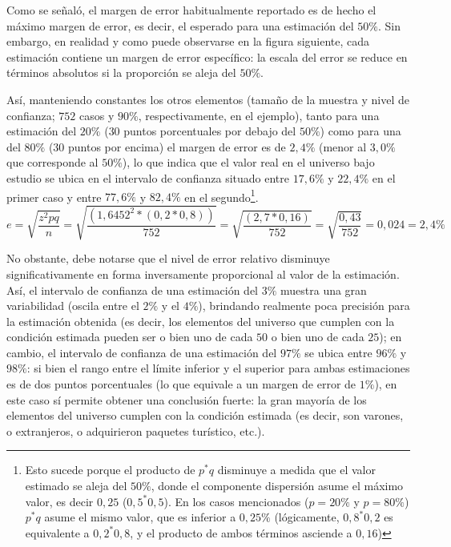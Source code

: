 \documentclass[
]{book}
\begin{document}
Como se señaló, el margen de error habitualmente reportado es de hecho el máximo margen de error, es decir, el esperado para una estimación del \(50\%\). Sin embargo, en realidad y como puede observarse en la figura siguiente, cada estimación contiene un margen de error específico: la escala del error se reduce en términos absolutos si la proporción se aleja del \(50\%\).

Así, manteniendo constantes los otros elementos (tamaño de la muestra y nivel de confianza; \(752\) casos y \(90\%\), respectivamente, en el ejemplo), tanto para una estimación del \(20\%\) (\(30\) puntos porcentuales por debajo del \(50\%\)) como para una del \(80\%\) (\(30\) puntos por encima) el margen de error es de \(2,4\%\) (menor al \(3,0\%\) que corresponde al \(50\%\)), lo que indica que el valor real en el universo bajo estudio se ubica en el intervalo de confianza situado entre \(17,6\%\) y \(22,4\%\) en el primer caso y entre \(77,6\%\) y \(82,4\%\) en el segundo\footnote{Esto sucede porque el producto de \(p^*q\) disminuye a medida que el valor estimado se aleja del \(50\%\), donde el componente dispersión asume el máximo valor, es decir \(0,25\) (\(0,5^*0,5\)). En los casos mencionados (\(p=20\%\) y \(p=80\%\)) \(p^*q\) asume el mismo valor, que es inferior a \(0,25\%\) (lógicamente, \(0,8^*0,2\) es equivalente a \(0,2^*0,8\), y el producto de ambos términos asciende a \(0,16\))}.\\

\[ e = \sqrt{\frac{z^2pq}{n}} = \sqrt{\frac{(1,6452^2 * (0,2 * 0,8))}{752}} = \sqrt{\frac{(2,7 * 0,16)}{752}} = \sqrt{\frac{0,43}{752}} = 0,024 = 2,4 \% \]

No obstante, debe notarse que el nivel de error relativo disminuye significativamente en forma inversamente proporcional al valor de la estimación. Así, el intervalo de confianza de una estimación del \(3\%\) muestra una gran variabilidad (oscila entre el \(2\%\) y el \(4\%\)), brindando realmente poca precisión para la estimación obtenida (es decir, los elementos del universo que cumplen con la condición estimada pueden ser o bien uno de cada \(50\) o bien uno de cada \(25\)); en cambio, el intervalo de confianza de una estimación del \(97\%\) se ubica entre \(96\%\) y \(98\%\): si bien el rango entre el límite inferior y el superior para ambas estimaciones es de dos puntos porcentuales (lo que equivale a un margen de error de \(1\%\)), en este caso sí permite obtener una conclusión fuerte: la gran mayoría de los elementos del universo cumplen con la condición estimada (es decir, son varones, o extranjeros, o adquirieron paquetes turístico, etc.).
\end{document}
